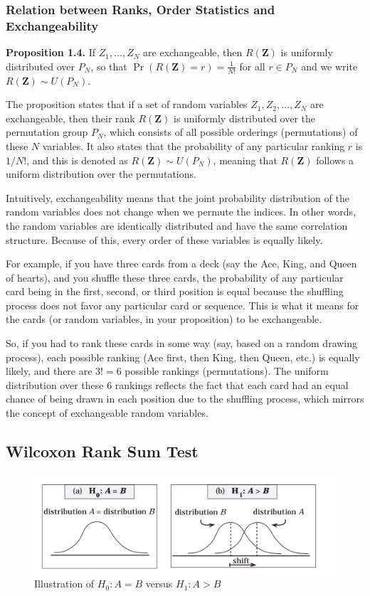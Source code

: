 \documentclass{article}
\begin{document}
\subsubsection{Relation between Ranks, Order Statistics and Exchangeability}
\textbf{Proposition 1.4.} If \( Z_1, \ldots, Z_N \) are exchangeable, then \( R(\mathbf{Z}) \) is uniformly distributed over \( P_N \), so that \( \Pr(R(\mathbf{Z}) = r) = \frac{1}{N!} \) for all \( r \in P_N \) and we write \( R(\mathbf{Z}) \sim U(P_N) \).

The proposition states that if a set of random variables \( Z_1, Z_2, \ldots, Z_N \) are exchangeable, then their rank \( R(\mathbf{Z}) \) is uniformly distributed over the permutation group \( P_N \), which consists of all possible orderings (permutations) of these \( N \) variables. It also states that the probability of any particular ranking \( r \) is \( 1/N! \), and this is denoted as \( R(\mathbf{Z}) \sim U(P_N) \), meaning that \( R(\mathbf{Z}) \) follows a uniform distribution over the permutations.

Intuitively, exchangeability means that the joint probability distribution of the random variables does not change when we permute the indices. In other words, the random variables are identically distributed and have the same correlation structure. Because of this, every order of these variables is equally likely.

For example, if you have three cards from a deck (say the Ace, King, and Queen of hearts), and you shuffle these three cards, the probability of any particular card being in the first, second, or third position is equal because the shuffling process does not favor any particular card or sequence. This is what it means for the cards (or random variables, in your proposition) to be exchangeable.

So, if you had to rank these cards in some way (say, based on a random drawing process), each possible ranking (Ace first, then King, then Queen, etc.) is equally likely, and there are \( 3! = 6 \) possible rankings (permutations). The uniform distribution over these 6 rankings reflects the fact that each card had an equal chance of being drawn in each position due to the shuffling process, which mirrors the concept of exchangeable random variables.

\subsection{Wilcoxon Rank Sum Test}
\begin{figure}
    \centering
    \includegraphics[width=1\linewidth]{figures/Screenshot 2024-01-17 at 19.11.14.png}
    \caption{Illustration of $H_0 : A = B$ versus $H_1 : A>B$}
    \label{fig:enter-label}
\end{figure}
\end{document}
